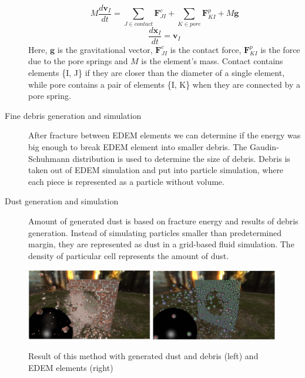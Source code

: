 \begin{description}
\[M\frac{d\mathbf{v}_I}{dt} = \sum_{J \in contact}^{} \mathbf{F}_{JI}^c + \sum_{K \in pore}^{} \mathbf{F}_{KI}^p + M\mathbf{g} \]
\[ \frac{d\mathbf{x}_I}{dt} = \mathbf{v}_I \]
Here, $\mathbf{g}$ is the gravitational vector, $\mathbf{F}^c_{JI}$ is the contact force, $\mathbf{F}^p_{KI}$ is the force due to the pore springs and $\mathit{M}$ is the element’s mass. Contact contains elements \{I, J\} if they are closer than the diameter of a single element, while pore
contains a pair of elements \{I, K\} when they are connected by a pore spring.

\item[Fine debris generation and simulation] After fracture between EDEM elements we can determine if the energy was big enough to break EDEM element into smaller debris. The Gaudin-Schuhmann distribution is used to determine the size of debris. Debris is taken out of EDEM simulation and put into particle simulation, where each piece is represented as a particle without volume.

\item[Dust generation and simulation] Amount of generated dust is based on fracture energy and results of debris generation. Instead of simulating particles smaller than predetermined margin, they are represented as dust in a grid-based fluid simulation. The density of particular cell represents the amount of dust.

\end{description}

 \begin{figure}[ht!]
        \centering
        \includegraphics[width=0.49\textwidth]{img/edem_real}
        \includegraphics[width=0.49\textwidth]{img/edem}
        \caption{Result of this method with generated dust and debris (left) and EDEM elements (right) \cite{edem}}
        \label{fig:edem}
    \end{figure}
   
